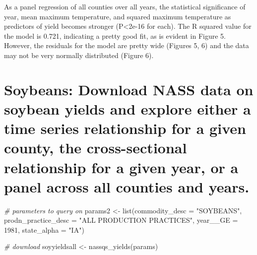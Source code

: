\documentclass[
]{book}
\newenvironment{Shaded}{\begin{snugshade}}{\end{snugshade}}
\newcommand{\AttributeTok}[1]{\textcolor[rgb]{0.77,0.63,0.00}{#1}}
\newcommand{\CommentTok}[1]{\textcolor[rgb]{0.56,0.35,0.01}{\textit{#1}}}
\newcommand{\DecValTok}[1]{\textcolor[rgb]{0.00,0.00,0.81}{#1}}
\newcommand{\FunctionTok}[1]{\textcolor[rgb]{0.00,0.00,0.00}{#1}}
\newcommand{\NormalTok}[1]{#1}
\newcommand{\OtherTok}[1]{\textcolor[rgb]{0.56,0.35,0.01}{#1}}
\newcommand{\StringTok}[1]{\textcolor[rgb]{0.31,0.60,0.02}{#1}}
\begin{document}
As a panel regression of all counties over all years, the statistical significance of year, mean maximum temperature, and squared maximum temperature as predictors of yield becomes stronger (P\textless2e-16 for each). The R squared value for the model is 0.721, indicating a pretty good fit, as is evident in Figure 5. However, the residuals for the model are pretty wide (Figures 5, 6) and the data may not be very normally distributed (Figure 6).

\hypertarget{soybeans-download-nass-data-on-soybean-yields-and-explore-either-a-time-series-relationship-for-a-given-county-the-cross-sectional-relationship-for-a-given-year-or-a-panel-across-all-counties-and-years.}{%
\section{Soybeans: Download NASS data on soybean yields and explore either a time series relationship for a given county, the cross-sectional relationship for a given year, or a panel across all counties and years.}\label{soybeans-download-nass-data-on-soybean-yields-and-explore-either-a-time-series-relationship-for-a-given-county-the-cross-sectional-relationship-for-a-given-year-or-a-panel-across-all-counties-and-years.}}

\begin{Shaded}
\begin{Highlighting}[]
\CommentTok{\# parameters to query on }
\NormalTok{params2 }\OtherTok{\textless{}{-}} \FunctionTok{list}\NormalTok{(}\AttributeTok{commodity\_desc =} \StringTok{"SOYBEANS"}\NormalTok{, }\AttributeTok{prodn\_practice\_desc =} \StringTok{"ALL PRODUCTION PRACTICES"}\NormalTok{, }\AttributeTok{year\_\_GE =} \DecValTok{1981}\NormalTok{, }\AttributeTok{state\_alpha =} \StringTok{"IA"}\NormalTok{)}

\CommentTok{\# download}
\NormalTok{soyyieldsall }\OtherTok{\textless{}{-}} \FunctionTok{nassqs\_yields}\NormalTok{(params)}
\end{Highlighting}
\end{Shaded}
\end{document}
